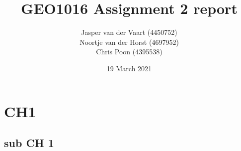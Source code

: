 \documentclass{report}
\title{GEO1016 Assignment 2 report}
\author{Jasper van der Vaart (4450752)\\Noortje van der Horst (4697952)\\Chris Poon (4395538)}
\date{19 March 2021}
\begin{document}
	
\maketitle
	
\section{CH1}

\subsection{sub CH 1}
\end{document}
